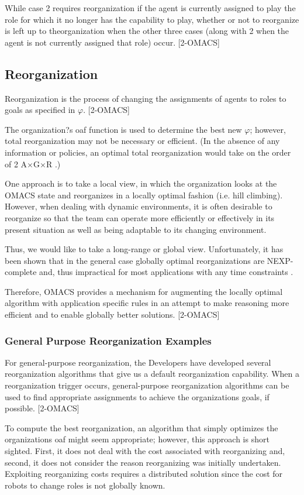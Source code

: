 While case 2 requires reorganization if the agent is currently assigned to play the role for which it no longer has the capability to play, whether or not to reorganize is left up to theorganization when the other three cases (along with 2 when the agent is not currently assigned that role) occur. [2-OMACS]


\subsection{ Reorganization }
Reorganization is the process of changing the assignments of agents to roles to goals as specified
in $\varphi$.  [2-OMACS]

The organization?s oaf function is used to determine the best new $\varphi$; however, total
reorganization may not be necessary or efficient. (In the absence of any information or policies,
an optimal total reorganization would take on the order of 2 A$\times$G$\times$R .)

One approach is to take a local view, in which the organization looks at the OMACS state and
reorganizes in a locally optimal fashion (i.e. hill climbing).
However, when dealing with dynamic environments, it is often desirable to reorganize so that 
the team can operate more efficiently or
effectively in its present situation as well as being adaptable to its changing environment. 

Thus, we would like to take a long-range or global view. Unfortunately, it has been shown that in the
general case globally optimal reorganizations are NEXP-complete and, thus impractical for most
applications with any time constraints . 

Therefore, OMACS provides a mechanism for augmenting the locally optimal algorithm with application specific rules in an attempt to make
reasoning more efficient and to enable globally better solutions.
[2-OMACS]
\subsubsection{ General Purpose Reorganization Examples }

For general-purpose reorganization, the Developers have developed several reorganization algorithms that
give us a default reorganization capability. When a reorganization trigger occurs, general-purpose
reorganization algorithms can be used to find appropriate assignments to achieve the
organizations goals, if possible. [2-OMACS]

To compute the best reorganization, an algorithm that simply
optimizes the organizations oaf might seem appropriate; however, this approach is short sighted.
First, it does not deal with the cost associated with reorganizing and, second, it does not consider
the reason reorganizing was initially undertaken. Exploiting reorganizing costs requires a
distributed solution since the cost for robots to change roles is not globally known. 

